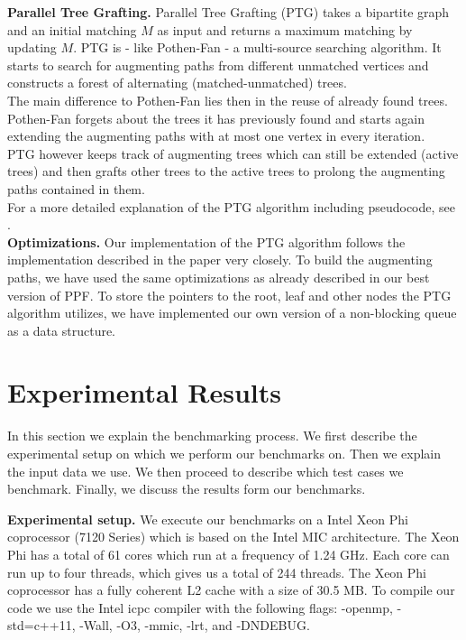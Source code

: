 \documentclass[letterpaper]{article}
\newcommand{\mypar}[1]{{\bf #1.}}
\begin{document}
\mypar{Parallel Tree Grafting} 
Parallel Tree Grafting (PTG) takes a bipartite graph and an initial matching $M$ as input and returns a maximum matching by updating $M$.
PTG is - like Pothen-Fan - a multi-source searching algorithm. It starts to search for augmenting paths from different unmatched vertices and constructs a forest of alternating (matched-unmatched) trees.\\
The main difference to Pothen-Fan lies then in the reuse of already found trees. Pothen-Fan forgets about the trees it has previously found and starts again extending the augmenting paths with at most one vertex in every iteration. \\
PTG however keeps track of augmenting trees which can still be extended (active trees) and then grafts other trees to the active trees to prolong the augmenting paths contained in them.\\
For a more detailed explanation of the PTG algorithm including pseudocode, see \cite{Azad:2015}.\\
\mypar{Optimizations}
Our implementation of the PTG algorithm follows the implementation described in the paper very closely. To build the augmenting paths, we have used the same optimizations as already described in our best version of  PPF. To store the pointers to the root, leaf and other nodes the PTG algorithm utilizes, we have implemented our own version of a non-blocking queue as a data structure. 

\section{Experimental Results}\label{sec:exp}

In this section we explain the benchmarking process. We first describe the experimental setup on which we perform our benchmarks on. Then we explain the input data we use. We then proceed to describe which test cases we benchmark. Finally, we discuss the results form our benchmarks.

\mypar{Experimental setup} 
We execute our benchmarks on a Intel Xeon Phi coprocessor (7120 Series) which is based on the Intel MIC architecture. The Xeon Phi has a total of 61 cores which run at a frequency of 1.24 GHz. Each core can run up to four threads, which gives us a total of 244 threads. The Xeon Phi coprocessor has a fully coherent L2 cache with a size of 30.5 MB. To compile our code we use the Intel icpc compiler with the following flags: -openmp, -std=c++11, -Wall, -O3, -mmic, -lrt, and -DNDEBUG.
\end{document}
